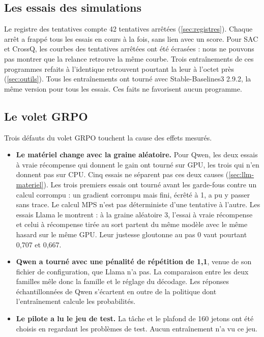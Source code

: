 \subsection{Les essais des simulations}

Le registre des tentatives compte 42 tentatives arrêtées (\cref{sec:registres}). Chaque arrêt a
frappé tous les essais en cours à la fois, sans lien avec un score. Pour SAC et CrossQ, les courbes
des tentatives arrêtées ont été écrasées : nous ne pouvons pas montrer que la relance retrouve
la même courbe. Trois entraînements de ces programmes refaits à l'identique retrouvent pourtant la leur
à l'octet près (\cref{sec:outils}).
Tous les entraînements ont tourné avec Stable-Baselines3 2.9.2, la même version pour tous les essais.
Ces faits ne favorisent aucun programme.

\subsection{Le volet GRPO}

Trois défauts du volet GRPO touchent la cause des effets mesurés.
\begin{itemize}
  \item \textbf{Le matériel change avec la graine aléatoire.} Pour Qwen, les deux essais à vraie
        récompense qui donnent le gain ont tourné sur GPU, les trois qui n'en donnent pas sur CPU.
        Cinq essais ne séparent pas ces deux causes (\cref{sec:llm-materiel}). Les trois premiers
        essais ont tourné avant les garde-fous contre un calcul corrompu : un gradient corrompu mais
        fini, écrêté à 1, a pu y passer sans trace. Le calcul MPS n'est pas déterministe d'une
        tentative à l'autre. Les essais Llama le montrent : à la graine aléatoire 3, l'essai à
        vraie récompense et celui à récompense tirée au sort partent du même modèle avec le même
        hasard sur le même GPU. Leur justesse gloutonne au pas 0 vaut pourtant 0,707 et 0,667.
  \item \textbf{Qwen a tourné avec une pénalité de répétition de 1,1}, venue de son fichier de
        configuration, que Llama n'a pas. La comparaison entre les deux familles mêle donc la
        famille et le réglage du décodage. Les réponses échantillonnées de Qwen s'écartent en outre de la politique dont l'entraînement calcule les probabilités.
  \item \textbf{Le pilote a lu le jeu de test.} La tâche et le plafond de 160 jetons ont été choisis
        en regardant les problèmes de test. Aucun entraînement n'a vu ce jeu.
\end{itemize}


